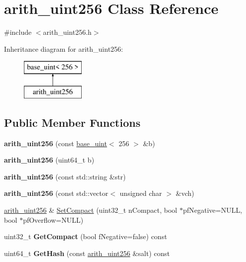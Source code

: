 \hypertarget{classarith__uint256}{}\section{arith\+\_\+uint256 Class Reference}
\label{classarith__uint256}


{\ttfamily \#include $<$arith\+\_\+uint256.\+h$>$}

Inheritance diagram for arith\+\_\+uint256\+:\begin{figure}[H]
\begin{center}
\leavevmode
\includegraphics[height=2.000000cm]{classarith__uint256}
\end{center}
\end{figure}
\subsection*{Public Member Functions}
\begin{DoxyCompactItemize}
\item 
\mbox{\label{classarith__uint256_a86c126d261e0edeea49e051e2f3b98a7}} 
{\bfseries arith\+\_\+uint256} (const \mbox{\hyperlink{classbase__uint}{base\+\_\+uint}}$<$ 256 $>$ \&b)
\item 
\mbox{\label{classarith__uint256_a865adeb2767f24e0efc3abfb3d75170b}} 
{\bfseries arith\+\_\+uint256} (uint64\+\_\+t b)
\item 
\mbox{\label{classarith__uint256_a0e8b76f74ffb7a251b15aff89b087fbf}} 
{\bfseries arith\+\_\+uint256} (const std\+::string \&str)
\item 
\mbox{\label{classarith__uint256_ae0bf2417eed7eda2cdf67b0779bc3340}} 
{\bfseries arith\+\_\+uint256} (const std\+::vector$<$ unsigned char $>$ \&vch)
\item 
\mbox{\hyperlink{classarith__uint256}{arith\+\_\+uint256}} \& \mbox{\hyperlink{classarith__uint256_a458133c9f123519646b07e6143f2164f}{Set\+Compact}} (uint32\+\_\+t n\+Compact, bool $\ast$pf\+Negative=N\+U\+LL, bool $\ast$pf\+Overflow=N\+U\+LL)
\item 
\mbox{\label{classarith__uint256_a0eeee9d8f29143ddf1bff2b1ffa8fdc1}} 
uint32\+\_\+t {\bfseries Get\+Compact} (bool f\+Negative=false) const
\item 
\mbox{\label{classarith__uint256_a2e18ce8980d2076c1fec89aff80ef497}} 
uint64\+\_\+t {\bfseries Get\+Hash} (const \mbox{\hyperlink{classarith__uint256}{arith\+\_\+uint256}} \&salt) const
\end{DoxyCompactItemize}

